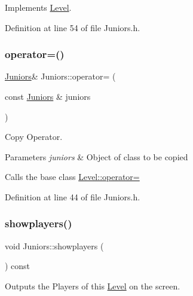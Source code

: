 Implements \hyperlink{class_level_a161cf8c238fd499c112d90504cb6f587}{Level}.



Definition at line 54 of file Juniors.\+h.

\hypertarget{class_juniors_adf648456072b60a7f99973c764c01c85}{}\label{class_juniors_adf648456072b60a7f99973c764c01c85} 
\subsubsection{\texorpdfstring{operator=()}{operator=()}}
{\footnotesize\ttfamily \hyperlink{class_juniors}{Juniors}\& Juniors\+::operator= (\begin{DoxyParamCaption}\item[{const \hyperlink{class_juniors}{Juniors} \&}]{juniors }\end{DoxyParamCaption})\hspace{0.3cm}{\ttfamily [inline]}}



Copy Operator. 


\begin{DoxyParams}{Parameters}
{\em juniors} & Object of class to be copied\\
\hline
\end{DoxyParams}
Calls the base class \hyperlink{class_level_a60eb04b65c900ae8dddf3d6251fac7b1}{Level\+::operator=} 

Definition at line 44 of file Juniors.\+h.

\hypertarget{class_juniors_aa312c32ccc0c9d3193036c20849b8669}{}\label{class_juniors_aa312c32ccc0c9d3193036c20849b8669} 
\subsubsection{\texorpdfstring{showplayers()}{showplayers()}}
{\footnotesize\ttfamily void Juniors\+::showplayers (\begin{DoxyParamCaption}{ }\end{DoxyParamCaption}) const\hspace{0.3cm}{\ttfamily [virtual]}}



Outputs the Players of this \hyperlink{class_level}{Level} on the screen. 



